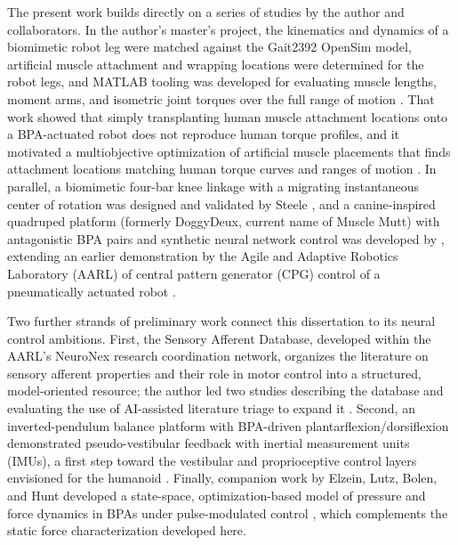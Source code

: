 The present work builds directly on a series of studies by the author and collaborators. In the author's master's project, the kinematics and dynamics of a biomimetic robot leg were matched against the Gait2392 OpenSim model, artificial muscle attachment and wrapping locations were determined for the robot legs, and MATLAB tooling was developed for evaluating muscle lengths, moment arms, and isometric joint torques over the full range of motion \citep{bolen_bipedal_2019, bolen_determination_2019}. That work showed that simply transplanting human muscle attachment locations onto a BPA-actuated robot does not reproduce human torque profiles, and it motivated a multiobjective optimization of artificial muscle placements that finds attachment locations matching human torque curves and ranges of motion \citep{morrow_optimization_2020}. In parallel, a biomimetic four-bar knee linkage with a migrating instantaneous center of rotation was designed and validated by Steele \citep{steele_development_2017, steele_biomimetic_2018, steele_biomimetic_2018-1}, and a canine-inspired quadruped platform (formerly DoggyDeux, current name of Muscle Mutt) with antagonistic BPA pairs and synthetic neural network control was developed by \citet{scharzenberger_design_2019}, extending an earlier demonstration by the Agile and Adaptive Robotics Laboratory (AARL) of central pattern generator (CPG) control of a pneumatically actuated robot \citep{hunt_development_2017}.

Two further strands of preliminary work connect this dissertation to its neural control ambitions. First, the Sensory Afferent Database, developed within the AARL's NeuroNex research coordination network, organizes the literature on sensory afferent properties and their role in motor control into a structured, model-oriented resource; the author led two studies describing the database and evaluating the use of AI-assisted literature triage to expand it \citep{bolen_sensory_2023, bolen_using_2024}. Second, an inverted-pendulum balance platform with BPA-driven plantarflexion/dorsiflexion demonstrated pseudo-vestibular feedback with inertial measurement units (IMUs), a first step toward the vestibular and proprioceptive control layers envisioned for the humanoid \citep{bolen_balance_2024, bolen_selfbalancing_2024, bolen_selfbalancing_srs_2024}. Finally, companion work by Elzein, Lutz, Bolen, and Hunt developed a state-space, optimization-based model of pressure and force dynamics in BPAs under pulse-modulated control \citep{elzein_pressure_2025}, which complements the static force characterization developed here.


